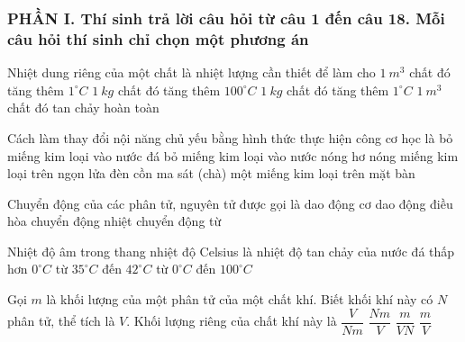 \subsubsection*{PHẦN I. Thí sinh trả lời câu hỏi từ câu 1 đến câu 18. Mỗi câu hỏi thí sinh chỉ chọn một phương án}
\setcounter{ex}{0}
\begin{ex} Nhiệt dung riêng của một chất là nhiệt lượng cần thiết để làm cho
\choice
{$1\ m^3$ chất đó tăng thêm $1^\circ C$}
{$1\ kg$ chất đó tăng thêm $100^\circ C$}
{\True $1\ kg$ chất đó tăng thêm $1^\circ C$}
{$1\ m^3$ chất đó tan chảy hoàn toàn}
\end{ex}
\begin{ex}
Cách làm thay đổi nội năng chủ yếu bằng hình thức thực hiện công cơ học là
\choice
{bỏ miếng kim loại vào nước đá}
{bỏ miếng kim loại vào nước nóng}
{hơ nóng miếng kim loại trên ngọn lửa đèn cồn}
{\True ma sát (chà) một miếng kim loại trên mặt bàn}
\end{ex}
\begin{ex}
Chuyển động của các phân tử, nguyên tử được gọi là
\choice
{dao động cơ}
{dao động điều hòa}
{\True chuyển động nhiệt}
{chuyển động từ}
\end{ex}
\begin{ex}
Nhiệt độ âm trong thang nhiệt độ Celsius là nhiệt độ
\choice
{tan chảy của nước đá}
{\True thấp hơn $0^\circ C$}
{từ $35^\circ C$ đến $42^\circ C$}
{từ $0^\circ C$ đến $100^\circ C$}
\end{ex}
\begin{ex}
Gọi $m$ là khối lượng của một phân tử của một chất khí. Biết khối khí này có $N$ phân tử, thể tích là $V$. Khối lượng riêng của chất khí này là
\choice
{$\dfrac{V}{Nm}$}
{\True $\dfrac{Nm}{V}$}
{$\dfrac{m}{VN}$}
{$\dfrac{m}{V}$}
\loigiai{}
\end{ex}
